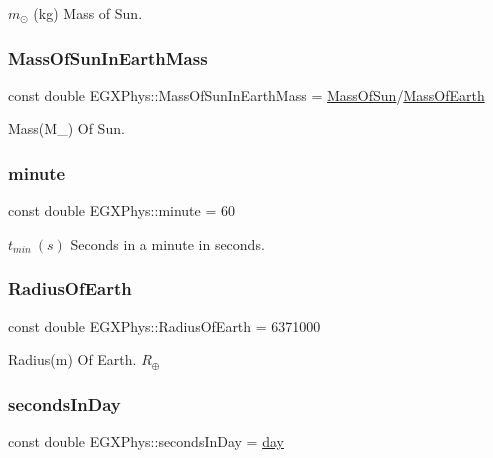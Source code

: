 $m_\odot$ (kg) Mass of Sun. \mbox{\label{namespace_e_g_x_phys_a05709972a6a6089eb968f667ce0bf656}} 
\subsubsection{\texorpdfstring{Mass\+Of\+Sun\+In\+Earth\+Mass}{MassOfSunInEarthMass}}
{\footnotesize\ttfamily const double E\+G\+X\+Phys\+::\+Mass\+Of\+Sun\+In\+Earth\+Mass = \hyperlink{namespace_e_g_x_phys_a6e84ae13f1dbcecb215af787bbc12cd6}{Mass\+Of\+Sun}/\hyperlink{namespace_e_g_x_phys_ace4a9d8c0b21215536857f4c1087a4e8}{Mass\+Of\+Earth}}

Mass(M\+\_\+) Of Sun. \mbox{\label{namespace_e_g_x_phys_ab3a72a63e9c502847d0db88a167dc02b}} 
\subsubsection{\texorpdfstring{minute}{minute}}
{\footnotesize\ttfamily const double E\+G\+X\+Phys\+::minute = 60}

$t_{min}\ (s)$ Seconds in a minute in seconds. \mbox{\label{namespace_e_g_x_phys_a11a2d4a914eb43c4095e225358293a45}} 
\subsubsection{\texorpdfstring{Radius\+Of\+Earth}{RadiusOfEarth}}
{\footnotesize\ttfamily const double E\+G\+X\+Phys\+::\+Radius\+Of\+Earth = 6371000}

Radius(m) Of Earth. $R_\oplus$ \mbox{\label{namespace_e_g_x_phys_ab4f86327f64403b843077ecc189ce52b}} 
\subsubsection{\texorpdfstring{seconds\+In\+Day}{secondsInDay}}
{\footnotesize\ttfamily const double E\+G\+X\+Phys\+::seconds\+In\+Day = \hyperlink{namespace_e_g_x_phys_a24d985ae6f6cefe7e25ac40806b88f79}{day}}

